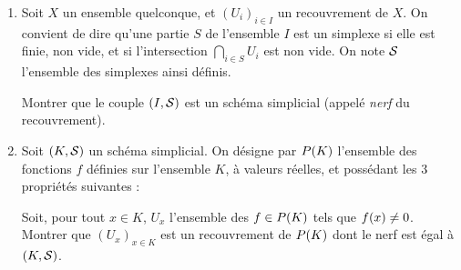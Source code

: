 \documentclass[a4paper,french,bookmarks]{article}
\begin{document}
    \begin{enumerate}
        \item Soit $X$ un ensemble quelconque, et $\left(U_i\right)_{i \in I}$ un recouvrement de $X$. On convient de dire qu'une partie $S$ de l'ensemble $I$ est un simplexe si elle est finie, non vide, et si l'intersection $\displaystyle\bigcap_{i \in S} U_i$ est non vide. On note $\mathcal{S}$ l'ensemble des simplexes ainsi définis.
        
        Montrer que le couple $\left(I, \mathcal{S}\right)$ est un schéma simplicial (appelé \emph{nerf} du recouvrement).


        \item Soit $\left(K,\mathcal{S}\right)$ un schéma simplicial. On désigne par $P\!\left(K\right)$ l'ensemble des fonctions $f$ définies sur l'ensemble $K$, à valeurs réelles, et possédant les $3$ propriétés suivantes :

        Soit, pour tout $x \in K$, $U_x$ l'ensemble des $f \in P\!\left(K\right)$ tels que $f\!\left(x\right) \neq 0$. Montrer que $\left(U_x\right)_{x \in K}$ est un recouvrement de $P\!\left(K\right)$ dont le nerf est égal à $\left(K, \mathcal{S}\right)$.

    \end{enumerate}
\end{document}
